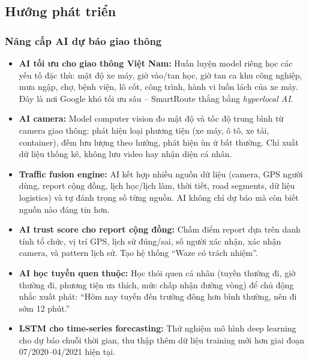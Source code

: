 \documentclass[12pt,a4paper]{article}
\begin{document}
\subsection{Hướng phát triển}

\subsubsection{Nâng cấp AI dự báo giao thông}
\begin{itemize}[leftmargin=1.2cm]
    \item \textbf{AI tối ưu cho giao thông Việt Nam:} Huấn luyện model riêng học các yếu tố đặc thù: mật độ xe máy, giờ vào/tan học, giờ tan ca khu công nghiệp, mưa ngập, chợ, bệnh viện, lô cốt, công trình, hành vi luồn lách của xe máy. Đây là nơi Google khó tối ưu sâu -- SmartRoute thắng bằng \textit{hyperlocal AI}.
    \item \textbf{AI camera:} Model computer vision đo mật độ và tốc độ trung bình từ camera giao thông: phát hiện loại phương tiện (xe máy, ô tô, xe tải, container), đếm lưu lượng theo hướng, phát hiện ùn ứ bất thường. Chỉ xuất dữ liệu thống kê, không lưu video hay nhận diện cá nhân.
    \item \textbf{Traffic fusion engine:} AI kết hợp nhiều nguồn dữ liệu (camera, GPS người dùng, report cộng đồng, lịch học/lịch làm, thời tiết, road segments, dữ liệu logistics) và tự đánh trọng số từng nguồn. AI không chỉ dự báo mà còn biết nguồn nào đáng tin hơn.
    \item \textbf{AI trust score cho report cộng đồng:} Chấm điểm report dựa trên danh tính tổ chức, vị trí GPS, lịch sử đúng/sai, số người xác nhận, xác nhận camera, và pattern lịch sử. Tạo hệ thống ``Waze có trách nhiệm''.
    \item \textbf{AI học tuyến quen thuộc:} Học thói quen cá nhân (tuyến thường đi, giờ thường đi, phương tiện ưa thích, mức chấp nhận đường vòng) để chủ động nhắc xuất phát: ``Hôm nay tuyến đến trường đông hơn bình thường, nên đi sớm 12 phút.''
    \item \textbf{LSTM cho time-series forecasting:} Thử nghiệm mô hình deep learning cho dự báo chuỗi thời gian, thu thập thêm dữ liệu training mới hơn giai đoạn 07/2020--04/2021 hiện tại.
\end{itemize}
\end{document}

